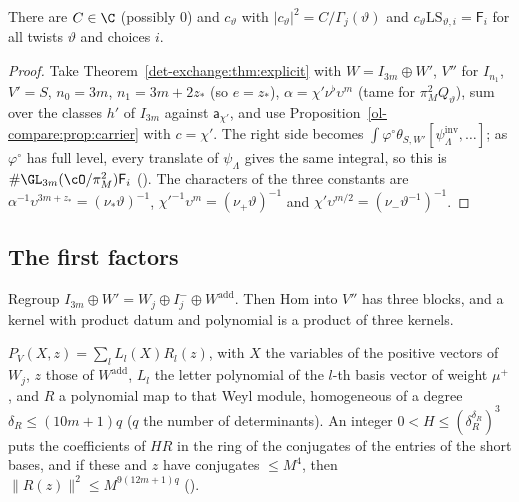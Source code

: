 \begin{proposition}
\label{ol-compare:prop:third}
There are $C\in\C$ (possibly $0$) and $c_\vartheta$ with $|c_\vartheta|^2=C/\Gamma_j(\vartheta)$ and
$c_\vartheta\mathrm{LS}_{\vartheta,i}=\mathsf F_i$ for all twists $\vartheta$ and choices $i$.
\end{proposition}

\begin{proof}
Take Theorem~\ref{det-exchange:thm:explicit} with $W=I_{3m}\oplus W'$, $V''$ for $I_{n_1}$, $V'=S$, $n_0=3m$,
$n_1=3m+2z_*$ (so $e=z_*$), $\alpha=\chi'\nu^\flat\upsilon^m$ (tame for $\pi_M^2Q_\vartheta$), sum over the classes $h'$
of $I_{3m}$ against $\mathsf a_{\chi'}$, and use Proposition~\ref{ol-compare:prop:carrier} with $c=\chi'$.
The right side becomes $\int\varphi^\circ\theta_{S,W'}[\psi^{\mathrm{inv}}_\Lambda,\dots]$; as $\varphi^\circ$ has
full level, every translate of $\psi_\Lambda$ gives the same integral, so this is
$\#\GL_{3m}(\cO/\pi_M^2)\mathsf F_i$ ().
The characters of the three constants are $\alpha^{-1}\upsilon^{3m+z_*}=(\nu_*\vartheta)^{-1}$,
$\chi'^{-1}\upsilon^m=(\nu_+\vartheta)^{-1}$ and $\chi'\upsilon^{m/2}=(\nu_-\vartheta^{-1})^{-1}$.
\end{proof}

\subsection{The first factors}\label{ol-compare:sec:first}

Regroup $I_{3m}\oplus W'=W_j\oplus I_j^-\oplus W^{\mathrm{add}}$. Then $\mathrm{Hom}$ into $V''$ has three
blocks, and a kernel with product datum and polynomial is a product of three kernels.

\begin{lemma}\label{ol-compare:lem:zeta}
$P_V(X,z)=\sum_lL_l(X)R_l(z)$, with $X$ the variables of the positive vectors of $W_j$, $z$ those
of $W^{\mathrm{add}}$, $L_l$ the letter polynomial of the $l$-th basis vector of weight $\mu^+$, and
$R$ a polynomial map to that Weyl module, homogeneous of a degree $\delta_R\le(10m+1)q$ ($q$ the
number of determinants). An integer $0<H\le(\delta_R^{\delta_R})^3$ puts the coefficients of $HR$ in the
ring of the conjugates of the entries of the short bases, and if these and $z$ have conjugates
$\le M^4$, then $\|R(z)\|^2\le M^{9(12m+1)q}$
().
\end{lemma}

